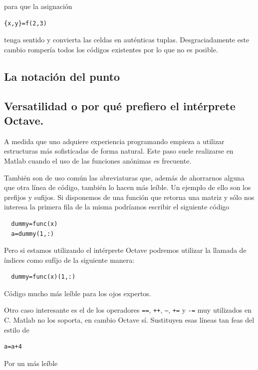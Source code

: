 para que la asignación

\begin{verbatim}
{x,y}=f(2,3)
\end{verbatim}

tenga sentido y convierta las celdas en auténticas
tuplas. Desgraciadamente este cambio rompería todos los códigos
existentes por lo que no es posible.

\subsection{La notación del punto}

\subsection{Versatilidad o por qué prefiero el intérprete Octave.}

A medida que uno adquiere experiencia programando empieza a utilizar
estructuras más sofisticadas de forma natural.  Este paso suele
realizarse en Matlab cuando el uso de las funciones anónimas es
frecuente. 

También son de uso común las abreviaturas que, además de ahorrarnos
alguna que otra línea de código, también lo hacen más leíble. Un
ejemplo de ello son los prefijos y sufijos.  Si disponemos de una
función que retorna una matriz y sólo nos interesa la primera fila de
la misma podríamos escribir el siguiente código

\begin{verbatim}
  dummy=func(x)
  a=dummy(1,:)
\end{verbatim}

Pero si estamos utilizando el intérprete Octave podremos utilizar la
llamada de índices como sufíjo de la siguiente manera:

\begin{verbatim}
  dummy=func(x)(1,:)
\end{verbatim}

Código mucho más leíble para los ojos expertos.

Otro caso interesante es el de los operadores \texttt{==},
\texttt{++}, \texttt{--}, \texttt{+=} y \texttt{-=} muy utilizados en
C.  Matlab no los soporta, en cambio Octave sí. Sustituyen esas líneas tan
feas del estilo de 

\begin{verbatim}
a=a+4
\end{verbatim}

Por un más leíble

